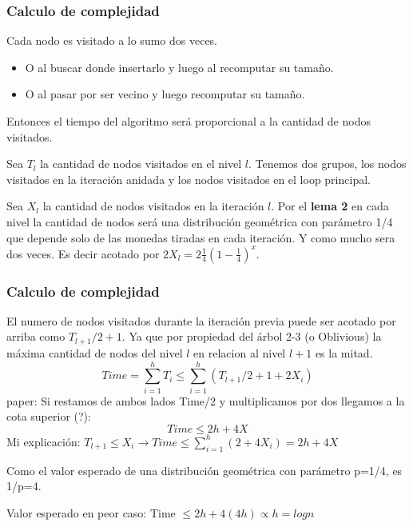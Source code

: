 \documentclass[10pt,handout]{beamer}
\begin{document}
\begin{frame}
\frametitle{Calculo de complejidad}



Cada nodo es visitado a lo sumo dos veces.
\begin{itemize}
  \item  O al buscar donde insertarlo y luego al recomputar su tama\~no.
  \item O al pasar por ser vecino y luego recomputar su tama\~no.
\end{itemize}


Entonces el tiempo del algoritmo será proporcional a la cantidad de nodos visitados.

Sea $T_l$ la cantidad de nodos visitados en el nivel $l$.
Tenemos dos grupos, los nodos  visitados en la iteración anidada y los nodos
visitados en el loop principal.

Sea $X_l$ la cantidad de nodos visitados en la iteración $l$.
Por el \textbf{lema 2} en cada nivel la cantidad de nodos será una distribución geométrica con parámetro 1/4 que
depende solo de las monedas tiradas en cada iteración.
Y como mucho sera dos veces.
Es decir acotado por $2X_l=2 \frac{1}{4}(1-\frac{1}{4})^x$.

\end{frame}

\begin{frame}
\frametitle{Calculo de complejidad}

El numero de nodos visitados durante la iteración previa puede ser acotado por arriba como $T_{l+1}/2 +1$.
Ya que por propiedad del árbol 2-3 (o Oblivious) la máxima cantidad de nodos del nivel $l$ en relacion
al nivel $l+1$ es la mitad.
\begin{equation}
  Time = \sum_{i=1}^h T_i\leq \sum_{i=1}^h (T_{l+1}/2 +1 + 2X_i)
\end{equation}
paper: Si restamos de ambos lados Time/2 y multiplicamos por dos llegamos a la cota superior (?):
\begin{equation}
  Time \leq 2h + 4X
\end{equation}
Mi explicación: $T_{l+1}\leq X_i \rightarrow  Time \leq \sum_{i=1}^h (2 + 4X_i) = 2h + 4X$

Como el valor esperado de una distribución geométrica con parámetro p=1/4, es 1/p=4.

\begin{mdframed}[backgroundcolor=frenchblue!20]
  Valor esperado en peor caso: Time $\leq 2h+4(4h) \propto h=logn$
\end{mdframed}
\end{frame}
\end{document}
